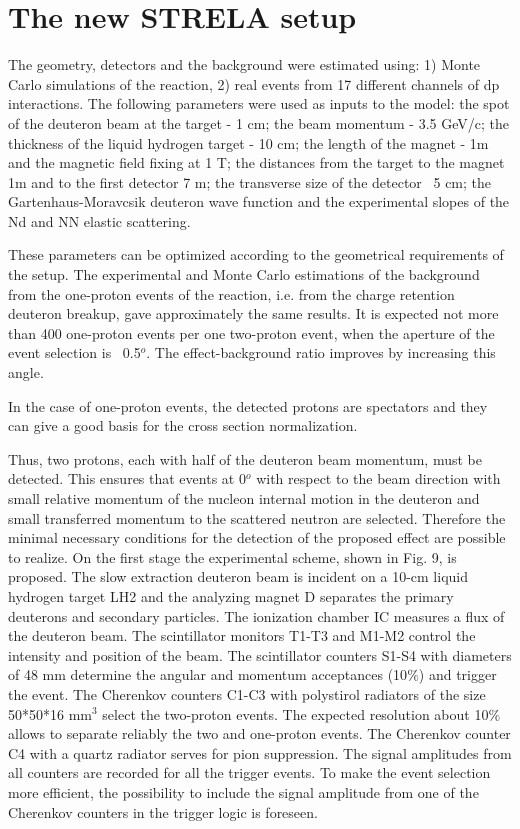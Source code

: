 \documentclass[a4paper,12pt]{article}
\begin{document}
    \section{The new STRELA setup}
    The geometry, detectors and the background were estimated using:
    1) Monte Carlo simulations of the   reaction,
    2) real events from 17 different channels of dp interactions.
    The following parameters were used as inputs to the model: the spot of the
    deuteron beam at the target - 1 cm; the beam momentum - 3.5 GeV/c;
    the thickness of the liquid hydrogen target - 10 cm;
    the length of the magnet - 1m and the magnetic field fixing at 1 T;
    the distances from the target to the magnet 1m and to the first detector 7 m;
    the transverse size of the detector ~5 cm;
    the  Gartenhaus-Moravcsik deuteron wave function  and the experimental
    slopes of the Nd and NN elastic scattering.

    These parameters can be optimized according to the geometrical requirements
    of the setup. The experimental and Monte Carlo estimations of the background from the
    one-proton events of the   reaction, i.e. from the charge retention deuteron
    breakup, gave approximately the same results. It is expected not more
    than 400 one-proton events per one two-proton event, when the aperture
    of the event selection is ~0.5$^o$.
    The effect-background ratio improves by increasing this angle.

    In the case of one-proton events, the detected
    protons are spectators and they can give a good basis for the cross section
    normalization.

    Thus, two protons, each with half of the deuteron beam momentum, must be
    detected. This ensures that events at 0$^o$ with respect to the beam direction
    with small relative momentum of the nucleon internal motion in the deuteron
    and small transferred momentum to the scattered neutron are selected.
    Therefore the minimal necessary conditions for the detection of the proposed
    effect are possible to realize. On the first stage the experimental scheme,
    shown in Fig. 9, is proposed. The slow extraction deuteron beam is incident
    on a 10-cm liquid hydrogen target LH2 and the analyzing magnet D separates
    the primary deuterons and secondary particles. The ionization chamber IC
    measures a flux of the deuteron beam. The scintillator monitors T1-T3
    and M1-M2 control the intensity and position of the beam. The scintillator
    counters S1-S4 with diameters of 48 mm determine the angular and momentum
    acceptances (10$\%$) and trigger the event. The Cherenkov counters C1-C3 with
    polystirol radiators of the size 50*50*16 mm$^3$ select the two-proton events.
    The expected resolution about 10$\%$ allows to separate reliably the two
    and one-proton events. The Cherenkov counter C4 with a quartz radiator
    serves for pion suppression. The signal amplitudes from all counters are
    recorded for all the trigger events. To make the event selection more
    efficient, the possibility to include the signal amplitude from
    one of the Cherenkov counters in the trigger logic is foreseen.
\end{document}

